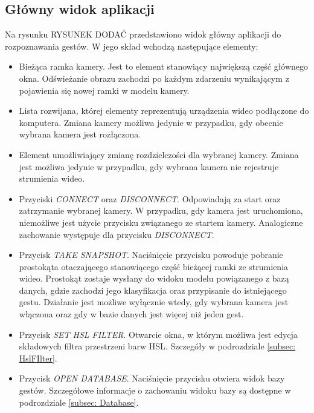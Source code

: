\subsection{Główny widok aplikacji}
Na rysunku RYSUNEK DODAĆ przedstawiono widok główny aplikacji do rozpoznawania gestów. W jego skład wchodzą następujące elementy:
\begin{itemize}
	\item Bieżąca ramka kamery. Jest to element stanowiący największą część głównego okna. Odświeżanie obrazu zachodzi po każdym zdarzeniu wynikającym z pojawienia się nowej ramki w modelu kamery.
	\item Lista rozwijana, której elementy reprezentują urządzenia wideo podłączone do komputera. Zmiana kamery możliwa jedynie w przypadku, gdy obecnie wybrana kamera jest rozłączona.
	\item Element umożliwiający zmianę rozdzielczości dla wybranej kamery. Zmiana jest możliwa jedynie w przypadku, gdy wybrana kamera nie rejestruje strumienia wideo.
	\item Przyciski \textit{CONNECT} oraz \textit{DISCONNECT}. Odpowiadają za start oraz zatrzymanie wybranej kamery. W przypadku, gdy kamera jest uruchomiona, niemożliwe jest użycie przycisku związanego ze startem kamery. Analogiczne zachowanie występuje dla przycisku \textit{DISCONNECT}.
	\item Przycisk \textit{TAKE SNAPSHOT}. Naciśnięcie przycisku powoduje pobranie prostokąta otaczającego stanowiącego część bieżącej ramki ze strumienia wideo. Prostokąt zostaje wysłany do widoku modelu powiązanego z bazą danych, gdzie zachodzi jego klasyfikacja oraz przypisanie do istniejącego gestu. Działanie jest możliwe wyłącznie wtedy, gdy wybrana kamera jest włączona oraz gdy w bazie danych jest więcej niż jeden gest. 
	\item Przycisk \textit{SET HSL FILTER}. Otwarcie okna, w którym możliwa jest edycja składowych filtra przestrzeni barw HSL. Szczegóły w podrozdziale \ref{subsec: HslFIlter}.
	\item Przycisk \textit{OPEN DATABASE}. Naciśnięcie przycisku otwiera widok bazy gestów. Szczegółowe informacje o zachowaniu widoku bazy są dostępne w podrozdziale \ref{subsec: Database}.
\end{itemize}


